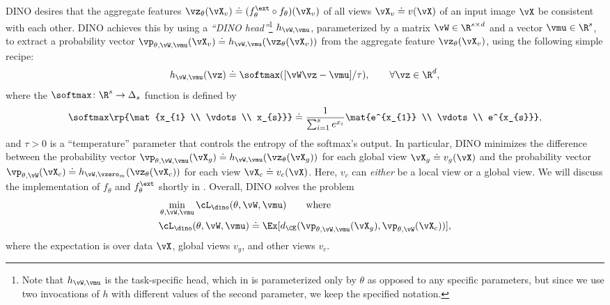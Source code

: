 \documentclass[../../book-main.tex]{subfiles}
\begin{document}
DINO desires that the aggregate features \(\vz_{\theta}(\vX_{v})
\doteq (f_{\theta}^{\ext} \circ f_{\theta})(\vX_{v})\) of all views
\(\vX_{v} \doteq v(\vX)\) of an input image \(\vX\) be consistent
with each other.
DINO achieves this by using a \textit{``DINO
head''}\footnote{Note that \(h_{\vW, \vmu}\) is the task-specific
    head, which in  is parameterized only by
    \(\theta\) as opposed to any specific parameters, but since we use
    two invocations of \(h\) with different values of the second
parameter, we keep the specified notation.} \(h_{\vW, \vmu}\),
parameterized by a matrix \(\vW \in \R^{s \times d}\) and a vector
\(\vmu \in \R^{s}\), to extract a probability vector \(\vp_{\theta,
\vW, \vmu}(\vX_{v}) \doteq h_{\vW, \vmu}(\vz_{\theta}(\vX_{v}))\)
from the aggregate feature \(\vz_{\theta}(\vX_{v})\), using the
following simple recipe:
\begin{equation}
    h_{\vW, \vmu}(\vz) \doteq \softmax([\vW\vz - \vmu]/\tau), \qquad
    \forall \vz \in \R^{d} ,
\end{equation}
where the \(\softmax \colon \R^{s} \to \Delta_{s}\) function is defined by
\begin{equation}
    \softmax\rp{\mat{x_{1} \\ \vdots \\ x_{s}}} \doteq
    \frac{1}{\sum_{i = 1}^{s}e^{x_{i}}}\mat{e^{x_{1}} \\ \vdots \\ e^{x_{s}}} ,
\end{equation}
and \(\tau > 0\) is a ``temperature'' parameter that controls the
entropy of the softmax's output.
In particular, DINO minimizes the difference between the probability
vector \(\vp_{\theta, \vW, \vmu}(\vX_{g}) \doteq h_{\vW,
\vmu}(\vz_{\theta}(\vX_{g}))\) for each global view \(\vX_{g} \doteq
v_{g}(\vX)\) and the probability vector \(\vp_{\theta, \vW}(\vX_{c})
\doteq h_{\vW, \vzero_{m}}(\vz_{\theta}(\vX_{c}))\) for each view
\(\vX_{c} \doteq v_{c}(\vX)\).
Here, \(v_{c}\) can \textit{either} be
a local view or a global view.
We will discuss the implementation of
\(f_{\theta}\) and \(f_{\theta}^{\ext}\) shortly in
.
Overall, DINO solves the problem
\begin{align}\label{eq:dino_loss}
    &\min_{\theta, \vW, \vmu}\cL_{\dino}(\theta, \vW, \vmu) \qquad
    \text{where} \nonumber \\
    &\cL_{\dino}(\theta, \vW, \vmu) \doteq \Ex[d_{\CE}(\vp_{\theta,
    \vW, \vmu}(\vX_{g}), \vp_{\theta, \vW}(\vX_{c}))] ,
\end{align}
where the expectation is over data \(\vX\), global views \(v_{g}\),
and other views \(v_{c}\).
\end{document}
